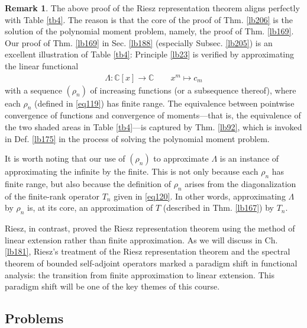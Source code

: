 \documentclass[12pt,b5paper,notitlepage]{article}
\theoremstyle{definition}
\newtheorem{rem}[df]{Remark}
\theoremstyle{plain}
\newcommand{\Cbb}{\mathbb C}
\newcommand{\hqed}{\hfill\qedsymbol}
\numberwithin{equation}{section}
\begin{document}
\begin{rem}
The above proof of the Riesz representation theorem aligns perfectly with Table \ref{tb4}. The reason is that the core of the proof of Thm. \ref{lb206} is the solution of the polynomial moment problem, namely, the proof of Thm. \ref{lb169}. Our proof of Thm. \ref{lb169} in Sec. \ref{lb188} (especially Subsec. \ref{lb205}) is an excellent illustration of Table \ref{tb4}: Principle \ref{lb23} is verified by approximating the linear functional
\begin{gather*}
\Lambda:\Cbb[x]\rightarrow\Cbb\qquad x^m\mapsto c_m
\end{gather*}
with a sequence $(\rho_n)$ of increasing functions (or a subsequence thereof), where each $\rho_n$ (defined in \eqref{eq119}) has finite range. The equivalence between pointwise convergence of functions and convergence of moments---that is, the equivalence of the two shaded areas in Table \ref{tb4}---is captured by Thm. \ref{lb92}, which is invoked in Def. \ref{lb175} in the process of solving the polynomial moment problem.

It is worth noting that our use of $(\rho_n)$ to approximate $\Lambda$ is an instance of approximating the infinite by the finite. This is not only because each $\rho_n$ has finite range, but also because the definition of $\rho_n$ arises from the diagonalization of the finite-rank operator $T_n$ given in \eqref{eq120}.  In other words, approximating $\Lambda$ by $\rho_n$ is, at its core, an approximation of $T$ (described in Thm. \ref{lb167}) by $T_n$.

Riesz, in contrast, proved the Riesz representation theorem using the method of linear extension rather than finite approximation. As we will discuss in Ch. \ref{lb181}, Riesz's treatment of the Riesz representation theorem and the spectral theorem of bounded self-adjoint operators marked a paradigm shift in functional analysis: the transition from finite approximation to linear extension. This paradigm shift will be one of the key themes of this course.    \hqed
\end{rem}



\subsection{Problems}
\end{document}
